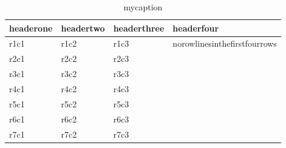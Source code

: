 \documentclass{article}
\begin{document}
\begin{table}[h!]
	\centering
	\caption{mycaption}
	\label{tab:test}
	\begin{tabular}{llll}
		\toprule
		\textbf{headerone} & \textbf{headertwo} & \textbf{headerthree} & \textbf{headerfour}                           \\\midrule
		r1c1               & r1c2               & r1c3                 & \multirow{4}{*}{norowlinesinthefirstfourrows} \\\cmidrule{1-3}
		r2c1               & r2c2               & r2c3                 &                                               \\\cmidrule{1-3}
		r3c1               & r3c2               & r3c3                 &                                               \\\cmidrule{1-3}
		r4c1               & r4c2               & r4c3                 &                                               \\\midrule
		r5c1               & r5c2               & r5c3                 &                                               \\\midrule
		r6c1               & r6c2               & r6c3                 &                                               \\\midrule
		r7c1               & r7c2               & r7c3                 &                                               \\\bottomrule
	\end{tabular}
\end{table}
\end{document}
